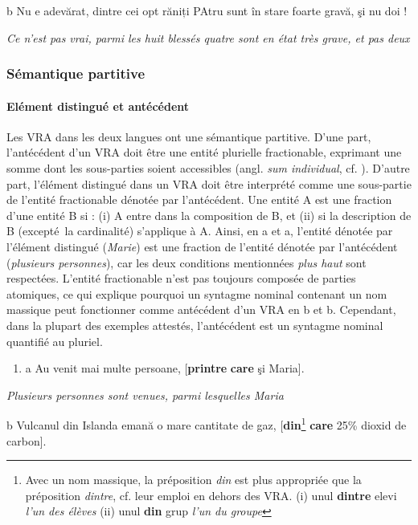   b  Nu e adevărat, dintre cei opt răniți PAtru sunt în stare foarte gravă, şi nu doi !

{\itshape
Ce n'est pas vrai, parmi les huit blessés quatre sont en état très grave, et pas deux}

\subsubsection{Sémantique partitive}
\label{bkm:Ref298317596}\paragraph[Elément distingué et antécédent]{Elément distingué et antécédent}
\label{bkm:Ref295410024}Les VRA dans les deux langues ont une sémantique partitive. D'une part, l'antécédent d'un VRA doit être une entité plurielle fractionable, exprimant une somme dont les sous-parties soient accessibles (angl. \textit{sum individual}, cf. \citet{Lasersohn1995}). D'autre part, l'élément distingué dans un VRA doit être interprété comme une sous-partie de l'entité fractionable dénotée par l'antécédent. Une entité A est une fraction d'une entité B si : (i) A entre dans la composition de B, et (ii) si la description de B (excepté~la cardinalité) s'applique à A. Ainsi, en a et a, l'entité dénotée par l'élément distingué (\textit{Marie}) est une fraction de l'entité dénotée par l'antécédent (\textit{plusieurs personnes}), car les deux conditions mentionnées \textit{plus haut} sont respectées. L'entité fractionable n'est pas toujours composée de parties atomiques, ce qui explique pourquoi un syntagme nominal contenant un nom massique peut fonctionner comme antécédent d'un VRA en b et b. Cependant, dans la plupart des exemples attestés, l'antécédent est un syntagme nominal quantifié au pluriel.


\begin{enumerate}
\item \label{bkm:Ref294027332}a  Au venit mai multe persoane, [\textbf{printre} \textbf{care} şi Maria].  


\end{enumerate}
{\itshape
Plusieurs personnes sont venues, parmi lesquelles Maria}

  b  Vulcanul din Islanda emană o mare cantitate de gaz, [\textbf{din}\footnote{Avec un nom massique, la préposition \textit{din} est plus appropriée que la préposition \textit{dintre}, cf. leur emploi en dehors des VRA.
(i)   unul \textbf{dintre} elevi
  \textit{l'un des élèves}
(ii)   unul \textbf{din} grup
  \textit{l'un du groupe } }\textbf{ care} 25\% dioxid de carbon].

